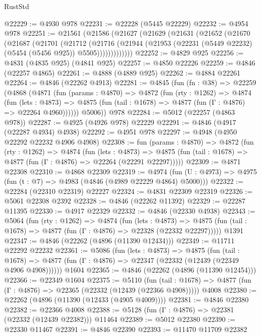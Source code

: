 \begin{lexlean}{RustStd}
\begin{coremodule}
@22229 := @4930 @978
@22231 := @22228 (@5445 @22229)
@22232 := @4954 @978
@22251 := @21561
    (@21586
      (@21627
        (@21629
          (@21631
            (@21652
              (@21670
                (@21687
                  (@21701
                    (@21712
                      (@21716
                        (@21944
                          (@21953 (@22231 (@5449 @22232) (@5454 (@5456 @925)) @5505)))))))))))))
@22252 := @4829 @925
@22256 := @4831 (@4835 @925) (@4841 @925)
@22257 := @4850 @22226
@22259 := @4846 (@22257 @4865)
@22261 := @4888 (@4889 @925)
@22262 := @4884 @22261
@22264 := @4846 (@22262 @4913)
@22281 := @4845
    (fun (fn : @38) =>
    @22259
      (@4868
        (@4871
          (fun (params : @4870) =>
          @4872
            (fun (rty : @1262) =>
            @4874
              (fun (lets : @4873) =>
              @4875 (fun (tail : @1678) => @4877 (fun (Γ : @4876) => @22264 @4960))))))
        @5006))
    @978
@22284 := @5012 (@22257 (@4863 @978))
@22287 := @4925 (@4926 @978) @22229
@22291 := @4846 (@4917 (@22287 @4934) @4938)
@22292 := @4951 @978
@22297 := @4948 (@4950 @22292 @22232 @4906 @4908)
@22308 := fun (params : @4870) =>
  @4872
    (fun (rty : @1262) =>
    @4874
      (fun (lets : @4873) =>
      @4875 (fun (tail : @1678) => @4877 (fun (Γ : @4876) => @22264 (@22291 @22297)))))
@22309 := @4871 @22308
@22310 := @4868 @22309
@22319 := @4974
    (fun (U : @4973) => @4975 (fun (t : @7) => @4983 (@4846 (@4989 @22229 @4864) @5000)))
@22322 := @22284 (@22310 @22319) @22227
@22324 := @4831 @22309 @22319
@22326 := @5061 @22308 @2392
@22328 := @4846 (@22262 @11392)
@22329 := @22287 @11395
@22330 := @4917 @22329
@22332 := @4846 (@22330 @4938)
@22343 := @5064
    (fun (rty : @1262) =>
    @4874
      (fun (lets : @4873) =>
      @4875 (fun (tail : @1678) => @4877 (fun (Γ : @4876) => @22328 (@22332 @22297)))))
    @1391
@22347 := @4846 (@22262 (@4896 (@11390 @12434)))
@22349 := @11711 @22292 @22232
@22361 := @5086
    (fun (lets : @4873) =>
    @4875
      (fun (tail : @1678) =>
      @4877 (fun (Γ : @4876) => @22347 (@22332 (@12439 (@22349 @4906 @4908))))))
    @1604
@22365 := @4846 (@22262 (@4896 (@11390 @12454)))
@22366 := @22349 @1604
@22375 := @5110
    (fun (tail : @1678) => @4877 (fun (Γ : @4876) => @22365 (@22332 (@12439 (@22366 @4908)))))
    @4008
@22380 := @22262 (@4896 (@11390 (@12433 (@4905 @4009))))
@22381 := @4846 @22380
@22382 := @22366 @4008
@22388 := @5128 (fun (Γ : @4876) => @22381 (@22332 (@12439 @22382))) @11464
@22389 := @5012 @22380
@22390 := @22330 @11467
@22391 := @4846 @22390
@22393 := @11470 @11709 @22382

\end{coremodule}
\end{lexlean}
